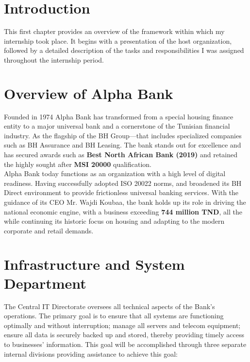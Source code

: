 \documentclass[12pt,a4paper]{report}
\begin{document}
\section{Introduction}

This first chapter provides an overview of the framework within which my internship took
place. It begins with a presentation of the host organization, followed by a detailed
description of the tasks and responsibilities I was assigned throughout the internship period.

\section{Overview of Alpha Bank}

Founded in 1974  Alpha Bank has transformed from a special housing finance entity to a major universal bank and a cornerstone of the Tunisian financial industry. As the flagship of the BH Group—that includes specialized companies such as BH Assurance and BH Leasing. The bank stands out for excellence and has secured awards such as \textbf{Best North African Bank (2019)} and retained the highly sought after \textbf{ MSI 20000 }qualification.\\

Alpha Bank today functions as an organization with a high level of digital readiness. Having successfully adopted ISO 20022 norms, and broadened its BH Direct environment to provide frictionless universal banking services. With the guidance of its CEO Mr. Wajdi Koubaa, the bank holds up its role in driving the national economic engine, with a business exceeding \textbf{744 million TND}, all the while continuing its historic focus on housing and adapting to the modern corporate and retail demands.

\section{Infrastructure and System Department}

The Central IT Directorate oversees all technical aspects of the Bank's operations. The primary goal is to ensure that all systems are functioning optimally and without interruption; manage all servers and telecom equipment; ensure all data is securely backed up and stored, thereby providing timely access to businesses' information. This goal will be accomplished through three separate internal divisions providing assistance to achieve this goal:
\end{document}
